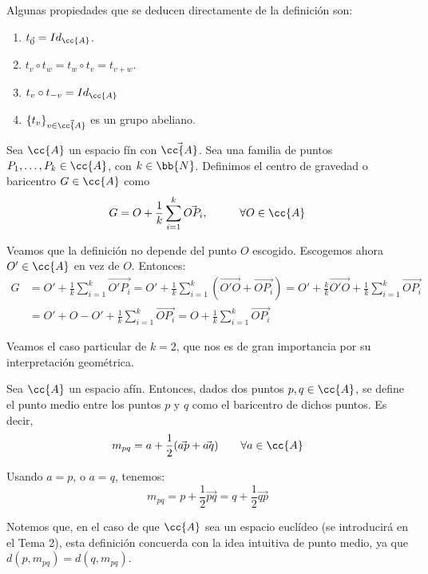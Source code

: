 Algunas propiedades que se deducen directamente de la definición son:
\begin{enumerate}
    \item $t_{\vec{0}}=Id_{\cc{A}}$.
    \item $t_v\circ t_w = t_w\circ t_v = t_{v+w}$.
    \item $t_v\circ t_{-v}=Id_{\cc{A}}$
    \item $\{t_v\}_{v\in \vec{\cc{A}}}$ es un grupo abeliano.
\end{enumerate}


\begin{definicion}
    Sea $\cc{A}$ un espacio fín con $\vec{\cc{A}}$. Sea una familia de puntos $P_1,\dots,P_k\in \cc{A}$, con $k\in \bb{N}$. Definimos el centro de gravedad o baricentro $G\in \cc{A}$ como
    $$G=O+\frac{1}{k}\sum_{i=1}^k \vec{OP_i}, \hspace{1cm} \forall O\in \cc{A}$$
\end{definicion}

Veamos que la definición no depende del punto $O$ escogido. Escogemos ahora $O'\in \cc{A}$ en vez de $O$. Entonces:
\begin{equation*}\begin{split}
    G&=O'+\frac{1}{k}\sum_{i=1}^k \vec{O'P_i}
    =O'+\frac{1}{k}\sum_{i=1}^k (\vec{O'O} + \vec{OP_i})
    = O' + \frac{k}{k}\vec{O'O} + \frac{1}{k}\sum_{i=1}^k \vec{OP_i}\\
    &= O' + O-O' + \frac{1}{k}\sum_{i=1}^k \vec{OP_i}
    = O+\frac{1}{k}\sum_{i=1}^k \vec{OP_i}
\end{split}\end{equation*}

Veamos el caso particular de $k=2$, que nos es de gran importancia por su interpretación geométrica.
\begin{definicion}\label{def:PuntoMedio} Sea $\cc{A}$ un espacio afín. Entonces, dados dos puntos $p,q\in \cc{A}$, se define el punto medio entre los puntos $p$ y $q$ como el baricentro de dichos puntos. Es decir,
    \begin{equation*}
        m_{pq} = a + \frac{1}{2}(\vec{ap} + \vec{aq}) \qquad \forall a\in \cc{A}
    \end{equation*}

    Usando $a=p$, o $a=q$, tenemos:
    \begin{equation*}
        m_{pq} = p+\frac{1}{2}\vec{pq} = q + \frac{1}{2}\vec{qp}
    \end{equation*}
\end{definicion}
Notemos que, en el caso de que $\cc{A}$ sea un espacio euclídeo (se introducirá en el Tema 2), esta definición concuerda con la idea intuitiva de punto medio, ya que $d(p,m_{pq})=d(q,m_{pq})$.


